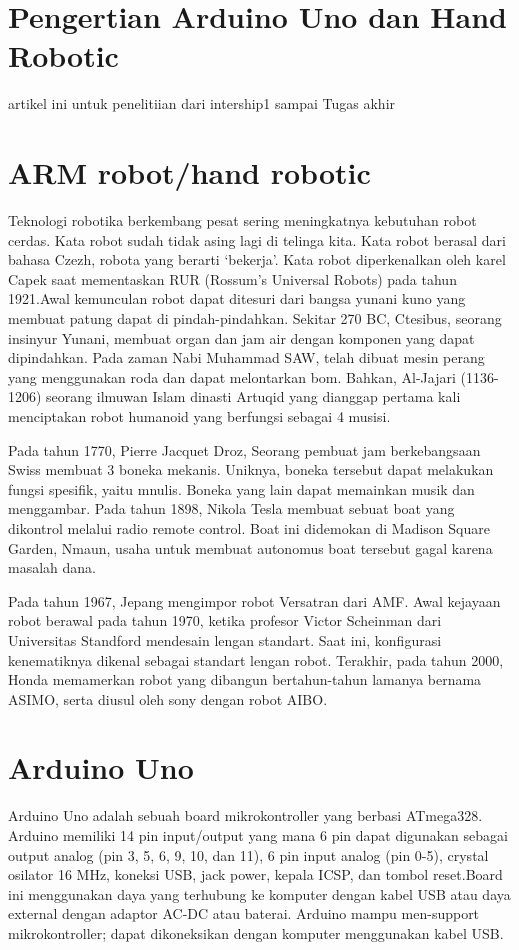 \section{Pengertian Arduino Uno dan Hand Robotic}

artikel ini untuk penelitiian dari intership1 sampai Tugas akhir
	


\section {ARM robot/hand robotic}
Teknologi robotika berkembang pesat sering meningkatnya kebutuhan robot cerdas. Kata robot sudah tidak asing lagi di telinga kita. Kata robot berasal dari bahasa Czezh, robota yang berarti ‘bekerja’. Kata robot diperkenalkan oleh karel Capek saat mementaskan RUR (Rossum’s Universal Robots) pada tahun 1921.Awal kemunculan robot dapat ditesuri dari bangsa yunani kuno yang membuat patung dapat di pindah-pindahkan. Sekitar 270 BC, Ctesibus, seorang insinyur Yunani, membuat organ dan jam air dengan komponen yang dapat dipindahkan. Pada zaman Nabi Muhammad SAW, telah dibuat mesin perang yang menggunakan roda dan dapat melontarkan bom. Bahkan, Al-Jajari (1136-1206) seorang ilmuwan Islam dinasti Artuqid yang dianggap pertama kali menciptakan robot humanoid yang berfungsi sebagai 4 musisi.

Pada tahun 1770, Pierre Jacquet Droz, Seorang pembuat jam berkebangsaan Swiss membuat 3 boneka mekanis. Uniknya, boneka tersebut dapat melakukan fungsi spesifik, yaitu mnulis. Boneka yang lain dapat memainkan musik dan menggambar. Pada tahun 1898, Nikola Tesla membuat sebuat boat yang dikontrol melalui radio remote control. Boat ini didemokan di Madison Square Garden, Nmaun, usaha untuk membuat autonomus boat tersebut gagal karena masalah dana.

	Pada tahun 1967, Jepang mengimpor robot Versatran dari AMF. Awal kejayaan robot berawal pada tahun 1970, ketika profesor Victor Scheinman dari Universitas Standford mendesain lengan standart. Saat ini, konfigurasi kenematiknya dikenal sebagai standart lengan robot. Terakhir, pada tahun 2000, Honda memamerkan robot yang dibangun bertahun-tahun lamanya bernama ASIMO, serta diusul oleh sony dengan robot AIBO. 

\section{Arduino Uno}
Arduino Uno adalah sebuah board mikrokontroller yang berbasi ATmega328.  Arduino  memiliki  14 pin input/output yang mana 6 pin dapat digunakan sebagai output analog (pin 3, 5, 6, 9, 10, dan 11), 6 pin input analog (pin 0-5), crystal osilator 16 MHz, koneksi USB, jack power, kepala ICSP, dan tombol reset.Board ini menggunakan daya yang terhubung ke komputer dengan kabel USB atau daya external dengan adaptor AC-DC atau baterai. Arduino mampu men-support mikrokontroller; dapat dikoneksikan dengan  komputer  menggunakan kabel USB.
